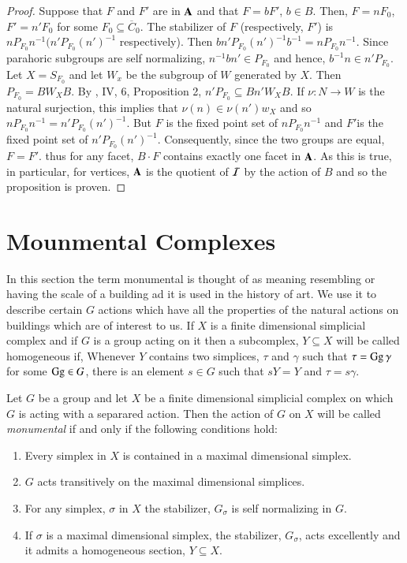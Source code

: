 \begin{proof}
Suppose that $F$ and $F'$ are in $\mathbf{A}$ and that $F=bF'$, $b \in B$. Then, $F= n F_{0}$, $F' =n'F_{0}$ for some $F_{0} \subseteq \overline{C}_{0}$. The stabilizer of $F$ (respectively, $F'$) is $nP_{F_{0}}n^{-1}(n'P_{F_{0}}(n')^{-1}$ respectively). Then $bn'P_{F_{0}}(n')^{-1}b^{-1} =nP_{F_{0}}n^{-1}$. Since parahoric subgroups are self normalizing, $n^{-1}bn' \in P_{F_{0}}$ and hence, $b^{-1}n \in n'P_{F_{0}}$. Let $X = S_{F_{0}}$ and let $W_{x}$ be the subgroup of $W$ generated by $X$. Then $P_{F_{0}} = BW_{X}B$. By \cite{chap6-NB I}, IV, 6, Proposition 2, $n'P_{F_{0}} \subseteq Bn'W_{X}B$. If $\nu : N \rightarrow W$ is the natural surjection, this implies that $\nu(n) \in \nu(n')w_{X}$ and so $nP_{F_{0}}n^{-1} = n'P_{F_{0}}(n')^{-1}$. But $F$ is the fixed point set of $nP_{F_{0}}n^{-1}$ and $F'$\pageoriginale is the fixed point set of $n'P_{F_{0}}(n')^{-1}$. Consequently, since the two groups are equal, $F =F'$. thus for any facet, $B \cdot F$ contains exactly one facet in $\mathbf{A}$. As this is true, in particular, for vertices, $\mathbf{A}$ is the quotient of $\mathcal{I}$ by the action of $B$ and so the proposition is proven.  
\end{proof}

\section{Mounmental Complexes}\label{chap6-sec-11}

In this section the term monumental is thought of as meaning resembling or having the scale of a building ad it is used in the history of art. We use it to describe certain $G$ actions which have all the properties of the natural actions on buildings which are of interest to us. If $X$ is a finite dimensional simplicial complex and if $G$ is a group acting on it then a subcomplex, $Y \subseteq X$ will be  called homogeneous if, Whenever $Y$ contains two simplices, $\tau$ and $\gamma$ such that $\tau = \operatorname{Gg} \gamma$ for some $\operatorname{Gg} \in G$, there is an element $s\in G$ such that $sY = Y$ and $\tau = s \gamma$.

\begin{definition}\label{chap6-definition-11.1}
Let $G$ be a group and let $X$ be a finite dimensional simplicial complex on  which $G$ is acting with a separared action. Then the action of $G$ on $X$ will be called \textit{monumental} if and only if the following conditions hold:
\begin{enumerate}[\rm (1)]
\item Every simplex in $X$ is contained in a maximal dimensional simplex.\label{chap6-}\label{chap6-definition11.1-enum-1}
\item $G$ acts transitively on the maximal dimensional simplices.\label{chap6-definition11.1-enum-2}
\item For any simplex, $\sigma$ in $X$ the stabilizer, $G_{\sigma}$ is self normalizing in $G$.\label{chap6-definition11.1-enum-3}
\item If $\sigma$ is a maximal dimensional simplex, the stabilizer, $G_{\sigma}$, acts excellently and it admits a homogeneous section, $Y \subseteq X$.\label{chap6-definition11.1-enum-4}
\end{enumerate}
\end{definition}

